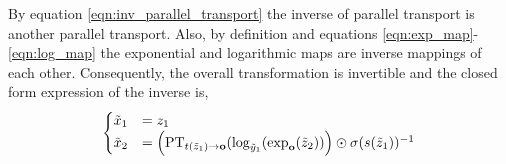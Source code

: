 By equation \ref{eqn:inv_parallel_transport} the inverse of parallel transport is another parallel transport. Also, by definition and equations \ref{eqn:exp_map}-\ref{eqn:log_map} the exponential and logarithmic maps are inverse mappings of each other. Consequently, the overall transformation is invertible and the closed form expression of the inverse is,
\begin{align}
     \begin{cases}
     \tilde{x}_{1} &= z_{1} \\
     \tilde{x}_{2} &= \Big( \textnormal{PT}_{t(\tilde{z}_{1}) \to \textbf{o} }(\log_{\tilde{y}_{1}}( \textnormal{exp}_{\textbf{o}}(\tilde{z}_{2}))\Big) \odot \sigma(s(\tilde{z}_{1}))^{-1} \\
    \end{cases}
\end{align}

